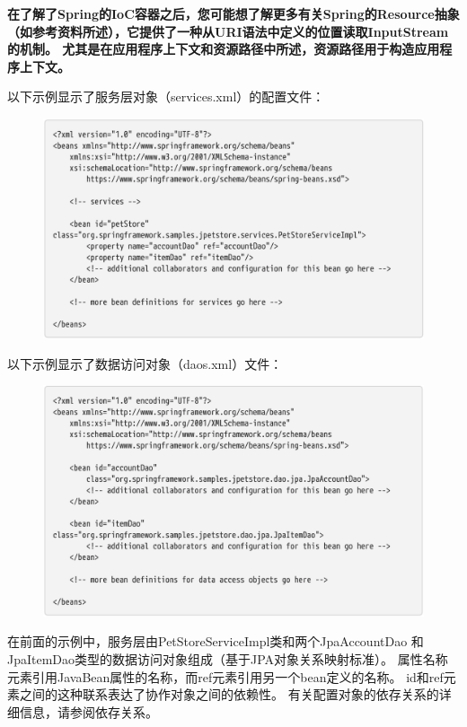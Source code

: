\newpage

\textbf{在了解了Spring的IoC容器之后，您可能想了解更多有关Spring的Resource抽象（如参考资料所述），它提供了一种从URI语法中定义的位置读取InputStream的机制。 尤其是在应用程序上下文和资源路径中所述，资源路径用于构造应用程序上下文。}

以下示例显示了服务层对象（services.xml）的配置文件：

\begin{figure}[ht]
\centering
\includegraphics[width=1\linewidth]{./Figure/IMG_code_3.png}
\end{figure}

以下示例显示了数据访问对象（daos.xml）文件：

\begin{figure}[ht]
\centering
\includegraphics[width=1\linewidth]{./Figure/IMG_code_4.png}
\end{figure}

在前面的示例中，服务层由PetStoreServiceImpl类和两个JpaAccountDao
和JpaItemDao类型的数据访问对象组成（基于JPA对象关系映射标准）。
 属性名称元素引用JavaBean属性的名称，而ref元素引用另一个bean定义的名称。 
 id和ref元素之间的这种联系表达了协作对象之间的依赖性。 
 有关配置对象的依存关系的详细信息，请参阅依存关系。

